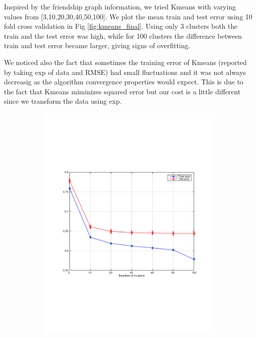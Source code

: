 Inspired by the friendship graph information, we tried Kmeans with
varying values from [3,10,20,30,40,50,100]. We plot the mean train and test error using 10 fold cross validation in Fig \ref{fig:kmeans_final}. Using only 3 clusters both the train and the test error was high, while for 100 clusters the difference between train and test error became larger, giving signs of overfitting.

We noticed also the fact that sometimes the training error of Kmeans
(reported by taking exp of data and RMSE) had small fluctuations and it was not always decreasig as the algorithm convergence properties would expect. This is due to the fact that Kmeans miminizes squared error but our cost is a little different since we transform the data using exp.

\begin{figure}[h]
  \centering
  \begin{subfigure}[b]{0.45\textwidth}
   \includegraphics[width=\textwidth]{figures/kmeans_train_test.pdf}
    \caption{}

\end{subfigure}
\end{figure}
